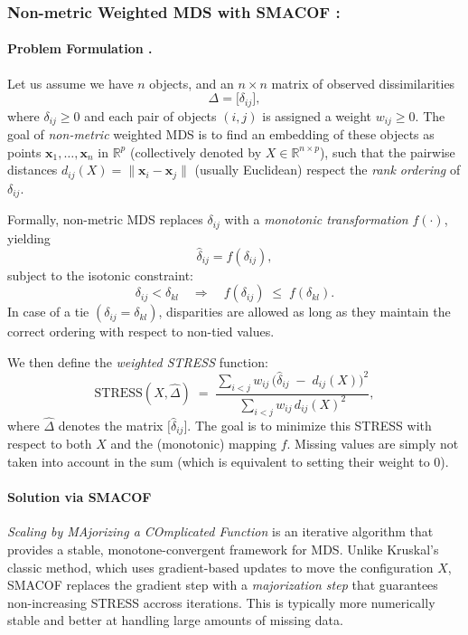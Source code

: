 \subsubsection*{Non-metric Weighted MDS with SMACOF \cite{smacof}:}
\paragraph{Problem Formulation .} Let us assume we have $n$ objects, and an $n\times n$ matrix of observed dissimilarities 
\[
\Delta = \bigl[\delta_{ij}\bigr],
\]
where $\delta_{ij} \ge 0$ and each pair of objects $(i,j)$ is assigned a weight $w_{ij}\ge 0$. The goal of \emph{non-metric} weighted MDS is to find an embedding of these objects as points $\mathbf{x}_1,\dots,\mathbf{x}_n$ in $\mathbb{R}^p$ (collectively denoted by $X \in \mathbb{R}^{n\times p}$), such that the pairwise distances $d_{ij}(X) = \|\mathbf{x}_i - \mathbf{x}_j\|$ (usually Euclidean) respect the \emph{rank ordering} of $\delta_{ij}$.

Formally, non-metric MDS replaces $\delta_{ij}$ with a \emph{monotonic transformation} $f(\cdot)$, yielding
\[
\hat{\delta}_{ij} = f(\delta_{ij}),
\]
subject to the isotonic constraint:
\[
\delta_{ij} < \delta_{kl} 
\quad \Longrightarrow \quad 
f(\delta_{ij}) \;\le\; f(\delta_{kl}).
\]
In case of a tie $(\delta_{ij} = \delta_{kl} )$, disparities are allowed as long as they maintain the correct ordering with respect to non-tied values.

We then define the \emph{weighted STRESS} function:
\begin{equation}
\mathrm{STRESS}(X,\hat{\Delta}) 
\;=\;
\frac{\sum_{i<j} w_{ij}\,\bigl(\hat{\delta}_{ij} \;-\; d_{ij}(X)\bigr)^2}{\sum_{i<j} w_{ij}\,d_{ij}(X)^2},
\label{eq:stress}
\end{equation}
where $\hat{\Delta}$ denotes the matrix $\bigl[\hat{\delta}_{ij}\bigr]$.  
The goal is to minimize this STRESS with respect to both $X$ and the (monotonic) mapping $f$. Missing values are simply not taken into account in the sum (which is equivalent to setting their weight to 0).

\paragraph{Solution via SMACOF}\label{sec:smacof-solution}
\emph{Scaling by MAjorizing a COmplicated Function} is an iterative algorithm that provides a stable, monotone-convergent framework for MDS. Unlike Kruskal's classic method, which uses gradient-based updates to move the configuration $X$, SMACOF replaces the gradient step with a \emph{majorization step} that guarantees non-increasing STRESS accross iterations. This is typically more numerically stable and better at handling large amounts of missing data.

